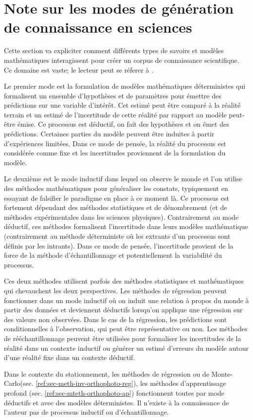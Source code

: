 \section{Note sur les modes de génération de connaissance en sciences}
Cette section va expliciter comment différents types de savoirs et modèles mathématiques interagissent pour créer un corpus de connaissance scientifique. Ce domaine est vaste; le lecteur peut se réferer à \textcite{thompson_understand_2012}.  \par
Le premier mode est la formulation de modèles mathématiques déterministes qui formalisent un ensemble d'hypothèses et de paramètres pour émettre des prédictions sur une variable d'intérêt. Cet estimé peut être comparé à la réalité terrain et un estimé de l'incertitude de cette réalité par rapport au modèle peut-être émise. Ce processus est déductif, on fait des hypothèses et on émet des prédictions. Certaines parties du modèle peuvent être induites à partir d'expériences limitées. Dans ce mode de pensée, la réalité du processus est considérée comme fixe et les incertitudes proviennent de la formulation du modèle. \par
Le deuxième est le mode inductif dans lequel on observe le monde et l'on utilise des méthodes mathématiques pour généraliser les constats, typiquement en essayant de falsifier le paradigme en place à ce moment là. Ce processus est fortement dépendant des méthodes statistiques et de dénombrement (et de méthodes expérimentales dans les sciences physiques). Contrairement au mode déductif, ces méthodes formalisent l'incertitude dans leurs modèles mathématique (contrairement au méthode déterministe où les extrants d'un processus sont définis par les intrants). Dans ce mode de pensée, l'incertitude provient de la force de la méthode d'échantillonnage et potentiellement la variabilité du processus.\par
Ces deux méthodes utilisent parfois des méthodes statistiques et mathématiques qui chevauchent les deux perspectives. Les méthodes de régression peuvent fonctionner dans un mode inductif où on induit une relation à propos du monde à partir des données et deviennent déductifs lorsqu'on applique une régression sur des valeurs non observées. Dans le cas de la régression, les prédictions sont conditionnelles à l'observation, qui peut être représentative ou non. Les méthodes de rééchantillonnage peuvent être utilisées pour formaliser les incertitudes de la réalité dans un contexte inductif ou générer un estimé d'erreurs du modèle autour d'une réalité fixe dans un contexte déductif. \par
Dans le contexte du stationnement, les méthodes de régression ou de Monte-Carlo(sec. \ref{ref:sec-meth-inv-orthophoto-reg}), les méthodes d'apprentissage profond (sec. \ref{ref:sec-mteth-orthophoto-ap}) fonctionnent toutes par mode déductifs et avec des modèles déterministes. Il n'existe à la connaissance de l'auteur pas de processus inductif ou d'échantillonnage.
